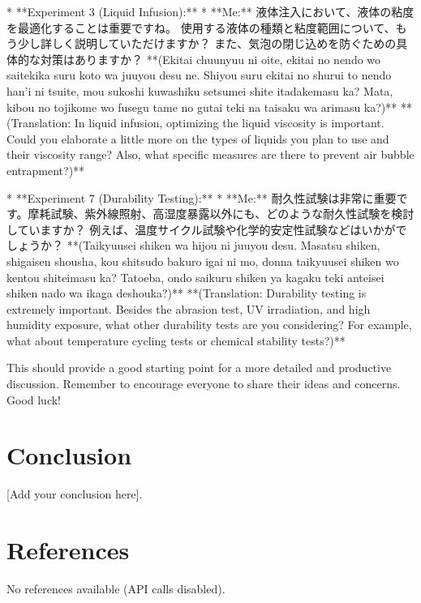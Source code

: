 \documentclass{article}
\begin{document}
*   **Experiment 3 (Liquid Infusion):**
    *   **Me:** 液体注入において、液体の粘度を最適化することは重要ですね。 使用する液体の種類と粘度範囲について、もう少し詳しく説明していただけますか？ また、気泡の閉じ込めを防ぐための具体的な対策はありますか？
        **(Ekitai chuunyuu ni oite, ekitai no nendo wo saitekika suru koto wa juuyou desu ne. Shiyou suru ekitai no shurui to nendo han'i ni tsuite, mou sukoshi kuwashiku setsumei shite itadakemasu ka? Mata, kibou no tojikome wo fusegu tame no gutai teki na taisaku wa arimasu ka?)**
        **(Translation: In liquid infusion, optimizing the liquid viscosity is important. Could you elaborate a little more on the types of liquids you plan to use and their viscosity range? Also, what specific measures are there to prevent air bubble entrapment?)**

*   **Experiment 7 (Durability Testing):**
    *   **Me:** 耐久性試験は非常に重要です。摩耗試験、紫外線照射、高湿度暴露以外にも、どのような耐久性試験を検討していますか？ 例えば、温度サイクル試験や化学的安定性試験などはいかがでしょうか？
        **(Taikyuusei shiken wa hijou ni juuyou desu. Masatsu shiken, shigaisen shousha, kou shitsudo bakuro igai ni mo, donna taikyuusei shiken wo kentou shiteimasu ka? Tatoeba, ondo saikuru shiken ya kagaku teki anteisei shiken nado wa ikaga deshouka?)**
        **(Translation: Durability testing is extremely important. Besides the abrasion test, UV irradiation, and high humidity exposure, what other durability tests are you considering? For example, what about temperature cycling tests or chemical stability tests?)**

This should provide a good starting point for a more detailed and productive discussion. Remember to encourage everyone to share their ideas and concerns. Good luck!


\section{Conclusion}
[Add your conclusion here].

\section{References}
No references available (API calls disabled).
\end{document}
